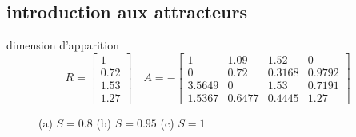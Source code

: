 \documentclass{wsdcr}
\begin{document}
\subsection{introduction aux attracteurs}
dimension d'apparition
\begin{equation}
R={\begin{bmatrix}1\\0.72\\1.53\\1.27\end{bmatrix}}\quad A =-{\begin{bmatrix}1&1.09&1.52&0\\0&0.72&0.3168&0.9792\\3.5649&0&1.53&0.7191\\1.5367&0.6477&0.4445&1.27\end{bmatrix}}
\end{equation}
\begin{figure}
    \centering
    \caption{(a) $S=0.8$ (b) $S=0.95$ (c) $S=1$}
    \label{fig:subbif}
\end{figure}
\end{document}
